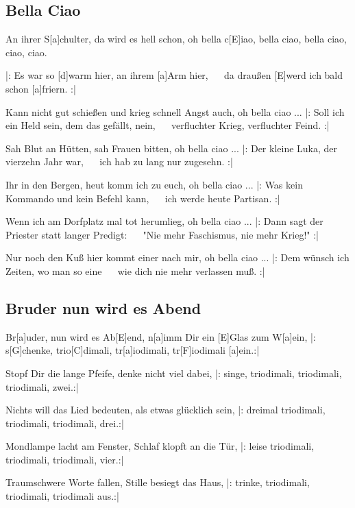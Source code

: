 \documentclass[10pt,a5paper,twoside]{scrbook}
\begin{document}
  	
\newpage  

  	
\subsection{Bella Ciao}
\begin{guitar}
An ihrer S[a]chulter, da wird es hell schon,
oh bella c[E]iao, bella ciao, bella ciao, ciao, ciao.

|: Es war so [d]warm hier, an ihrem [a]Arm hier,
~~  da draußen [E]werd ich bald schon [a]friern. :| 


Kann nicht gut schießen und krieg schnell Angst auch, oh bella ciao ...
|: Soll ich ein Held sein, dem das gefällt, nein, 
~~  verfluchter Krieg, verfluchter Feind. :|


Sah Blut an Hütten, sah Frauen bitten, oh bella ciao ...
|: Der kleine Luka, der vierzehn Jahr war, 
~~ ich hab zu lang nur zugesehn. :|


Ihr in den Bergen, heut komm ich zu euch, oh bella ciao ...
|: Was kein Kommando und kein Befehl kann, 
~~  ich werde heute Partisan. :|


Wenn ich am Dorfplatz mal tot herumlieg, oh bella ciao ...
|: Dann sagt der Priester statt langer Predigt: 
~~  "Nie mehr Faschismus, nie mehr Krieg!" :|


Nur noch den Kuß hier kommt einer nach mir, oh bella ciao ...
|: Dem wünsch ich Zeiten, wo man so eine 
~~ wie dich nie mehr verlassen muß. :|
\end{guitar}

  	
\newpage  

  	
\subsection{Bruder nun wird es Abend}
\begin{guitar}
Br[a]uder, nun wird es Ab[E]end, n[a]imm Dir ein [E]Glas zum W[a]ein,
|: s[G]chenke, trio[C]dimali, tr[a]iodimali, tr[F]iodimali [a]ein.:|


Stopf Dir die lange Pfeife, denke nicht viel dabei,
|: singe, triodimali, triodimali, triodimali, zwei.:|


Nichts will das Lied bedeuten, als etwas glücklich sein,
|: dreimal triodimali, triodimali, triodimali, drei.:|

Mondlampe lacht am Fenster, Schlaf klopft an die Tür,
|: leise triodimali, triodimali, triodimali, vier.:|

Traumschwere Worte fallen, Stille besiegt das Haus,
|: trinke, triodimali, triodimali, triodimali aus.:|
\end{guitar}
\end{document}
